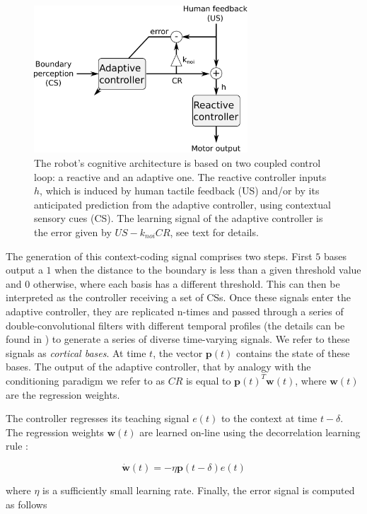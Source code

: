 \documentclass[letterpaper, 10 pt, conference]{ieeeconf}  %
\begin{document}
\begin{figure}[!t]
\centering
\includegraphics[width=8cm]{architecture}
\caption{The robot's cognitive architecture is based on two coupled control loop: a reactive and an adaptive one. The reactive controller inputs $h$, which is induced by human tactile feedback (US) and/or by its anticipated prediction from the adaptive controller, using contextual sensory cues (CS). The learning signal of the adaptive controller is the error given by $US - k_{noi}CR$, see text for details.}
\label{fig:architecture}
\end{figure}

The generation of this context-coding signal comprises two steps. First $5$ bases output a $1$ when the distance to the boundary is less than a given threshold value and $0$ otherwise, where each basis has a different threshold. This can then be interpreted as the controller receiving a set of CSs. Once these signals enter the adaptive controller, they are replicated n-times and passed through a series of double-convolutional filters with different temporal profiles (the details can be found in \cite{herreros2013speed}) to generate a series of diverse time-varying signals. We refer to these signals as \emph{cortical bases}. At time $t$, the vector $\mathbf{p}(t)$ contains the state of these bases. The output of the adaptive controller, that by analogy with the conditioning paradigm we refer to as $CR$ is equal to $\mathbf{p}(t)^T \mathbf{w}(t)$, where $\mathbf{w}(t)$ are the regression weights.

The controller regresses its teaching signal $e(t)$ to the context at time $t-\delta$. The regression weights $\mathbf{w}(t)$ are learned on-line using the decorrelation learning rule \cite{fujita1982adaptive}:

\[
\dot{\mathbf{w}}(t) = -\eta \mathbf{p}(t-\delta) e(t)
\]

where $\eta$ is a sufficiently small learning rate. Finally, the error signal is computed as follows
\end{document}

